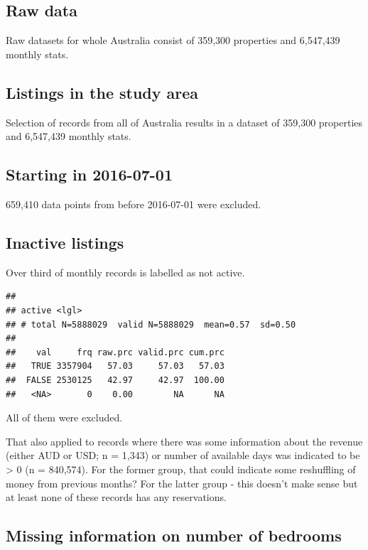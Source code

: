 \documentclass[]{article}
\begin{document}
\subsection{Raw data}\label{raw-data}

Raw datasets for whole Australia consist of 359,300 properties and
6,547,439 monthly stats.

\subsection{Listings in the study
area}\label{listings-in-the-study-area}

Selection of records from all of Australia results in a dataset of
359,300 properties and 6,547,439 monthly stats.

\subsection{Starting in 2016-07-01}\label{starting-in-2016-07-01}

659,410 data points from before 2016-07-01 were excluded.

\subsection{Inactive listings}\label{inactive-listings}

Over third of monthly records is labelled as not active.

\begin{verbatim}
## 
## active <lgl>
## # total N=5888029  valid N=5888029  mean=0.57  sd=0.50
## 
##    val     frq raw.prc valid.prc cum.prc
##   TRUE 3357904   57.03     57.03   57.03
##  FALSE 2530125   42.97     42.97  100.00
##   <NA>       0    0.00        NA      NA
\end{verbatim}

All of them were excluded.

That also applied to records where there was some information about the
revenue (either AUD or USD; n = 1,343) or number of available days was
indicated to be \textgreater{} 0 (n = 840,574). For the former group,
that could indicate some reshuffling of money from previous months? For
the latter group - this doesn't make sense but at least none of these
records has any reservations.

\subsection{Missing information on number of
bedrooms}\label{missing-information-on-number-of-bedrooms}
\end{document}
